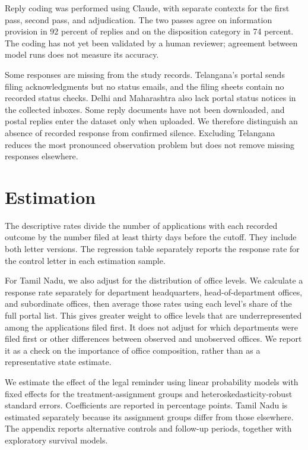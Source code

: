 \documentclass[11pt]{article}
\begin{document}
Reply coding was performed using Claude, with separate contexts for the first pass, second pass, and adjudication. The two passes agree on information provision in 92 percent of replies and on the disposition category in 74 percent. The coding has not yet been validated by a human reviewer; agreement between model runs does not measure its accuracy.

Some responses are missing from the study records. Telangana's portal sends filing acknowledgments but no status emails, and the filing sheets contain no recorded status checks. Delhi and Maharashtra also lack portal status notices in the collected inboxes. Some reply documents have not been downloaded, and postal replies enter the dataset only when uploaded. We therefore distinguish an absence of recorded response from confirmed silence. Excluding Telangana reduces the most pronounced observation problem but does not remove missing responses elsewhere.

\section{Estimation}
The descriptive rates divide the number of applications with each recorded outcome by the number filed at least thirty days before the cutoff. They include both letter versions. The regression table separately reports the response rate for the control letter in each estimation sample.

For Tamil Nadu, we also adjust for the distribution of office levels. We calculate a response rate separately for department headquarters, head-of-department offices, and subordinate offices, then average those rates using each level's share of the full portal list. This gives greater weight to office levels that are underrepresented among the applications filed first. It does not adjust for which departments were filed first or other differences between observed and unobserved offices. We report it as a check on the importance of office composition, rather than as a representative state estimate.

We estimate the effect of the legal reminder using linear probability models with fixed effects for the treatment-assignment groups and heteroskedasticity-robust standard errors. Coefficients are reported in percentage points. Tamil Nadu is estimated separately because its assignment groups differ from those elsewhere. The appendix reports alternative controls and follow-up periods, together with exploratory survival models.
\end{document}
